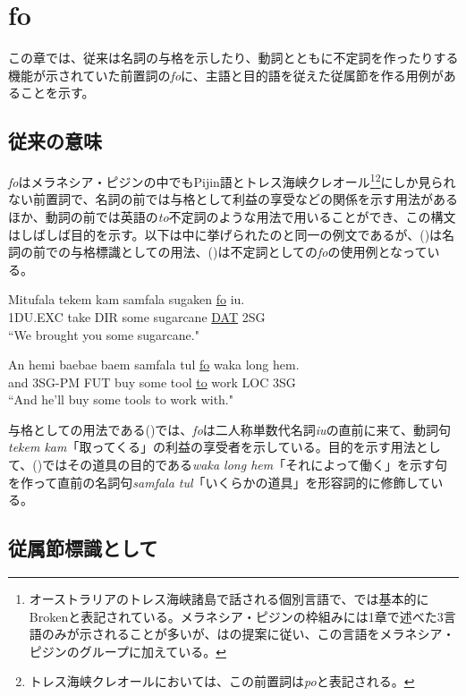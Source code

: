\chapter{fo}
この章では、従来は名詞の与格を示したり、動詞とともに不定詞を作ったりする機能が示されていた前置詞の\textit{fo}に、主語と目的語を従えた従属節を作る用例があることを示す。

\section{従来の意味}\label{sec:originalfo}
\textit{fo}はメラネシア・ピジンの中でもPijin語とトレス海峡クレオール\footnote{\label{fn:broken}
オーストラリアのトレス海峡諸島で話される個別言語で、\cite{prepositions}では基本的にBrokenと表記されている。メラネシア・ピジンの枠組みには1章で述べた3言語のみが示されることが多いが、\cite{prepositions}は\cite{keesing}の提案に従い、この言語をメラネシア・ピジンのグループに加えている。}\footnote{トレス海峡クレオールにおいては、この前置詞は\textit{po}と表記される\citep{prepositions}。}にしか見られない前置詞で、名詞の前では与格として利益の享受などの関係を示す用法があるほか、動詞の前では英語の\textit{to}不定詞のような用法で用いることができ、この構文はしばしば目的を示す\citep{prepositions}。以下は\cite{prepositions}中に挙げられたのと同一の例文であるが、()は名詞の前での与格標識としての用法、()は不定詞としての\textit{fo}の使用例となっている。

\begin{exe}
\ex
\gll Mitufala tekem kam samfala sugaken \underline{fo} iu.\\
1DU.EXC take DIR some sugarcane \underline{DAT} 2SG\\
\glt ``We brought you some sugarcane." \cite[44]{rr2}

\ex
\gll An hemi baebae baem samfala tul \underline{fo} waka long hem.\\
and 3SG-PM FUT buy some tool \underline{to} work LOC 3SG\\
\glt ``And he'll buy some tools to work with." \cite[270]{todd}
\end{exe}

与格としての用法である()では、\textit{fo}は二人称単数代名詞\textit{iu}の直前に来て、動詞句\textit{tekem kam}「取ってくる」の利益の享受者を示している。目的を示す用法として、()ではその道具の目的である\textit{waka long hem}「それによって働く」を示す句を作って直前の名詞句\textit{samfala tul}「いくらかの道具」を形容詞的に修飾している。

\section{従属節標識として}
